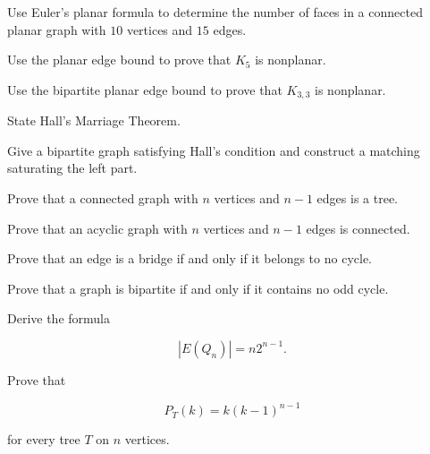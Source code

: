 \begin{exercise}[2]
Use Euler's planar formula to determine the number of faces in a
connected planar graph with \(10\) vertices and \(15\) edges.
\end{exercise}

\begin{exercise}[2]
Use the planar edge bound to prove that \(K_5\) is nonplanar.
\end{exercise}

\begin{exercise}[2]
Use the bipartite planar edge bound to prove that \(K_{3,3}\) is
nonplanar.
\end{exercise}

\begin{exercise}[2]
State Hall's Marriage Theorem.
\end{exercise}

\begin{exercise}[2]
Give a bipartite graph satisfying Hall's condition and construct a
matching saturating the left part.
\end{exercise}

\begin{exercise}[3]
Prove that a connected graph with \(n\) vertices and \(n-1\) edges is a
tree.
\end{exercise}

\begin{exercise}[3]
Prove that an acyclic graph with \(n\) vertices and \(n-1\) edges is
connected.
\end{exercise}

\begin{exercise}[3]
Prove that an edge is a bridge if and only if it belongs to no cycle.
\end{exercise}

\begin{exercise}[3]
Prove that a graph is bipartite if and only if it contains no odd
cycle.
\end{exercise}

\begin{exercise}[3]
Derive the formula

\[
|E(Q_n)|=n2^{n-1}.
\]
\end{exercise}

\begin{exercise}[3]
Prove that

\[
P_T(k)=k(k-1)^{n-1}
\]

for every tree \(T\) on \(n\) vertices.
\end{exercise}

